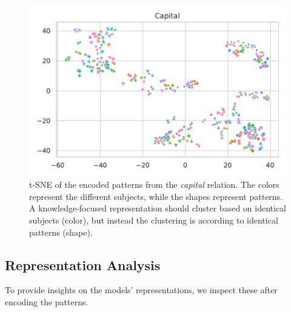 \begin{figure}[t!]
\centering
\vspace{-0.1in}
\includegraphics[width=.8\columnwidth]{figures/capital-bert-large}


\caption{t-SNE of the encoded patterns from the
  \textit{capital} relation. The colors
  represent the different subjects, while the shapes
  represent patterns. A knowledge-focused representation
  should cluster based on identical subjects (color), but
  instead the clustering is according to identical patterns (shape).}
  \vspace{-0.2in}
\label{fig:tsne-emb}

\end{figure}

\subsection{Representation Analysis}


To provide insights on the models' representations, we inspect these after encoding the patterns.

